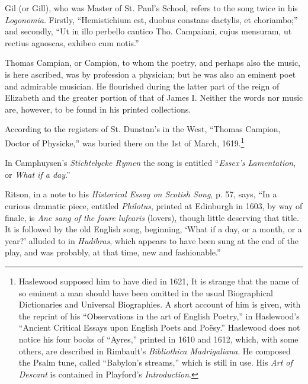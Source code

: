 Gil (or Gill), who was Master of St. Paul’s School, refers to the song twice in his
\textit{Logonomia}. Firstly, “Hemistichium est, duobus constans dactylis, et choriambo;”
and secondly, “Ut in illo perbello cantico Tho. Campaiani, cujus mensuram, ut
rectius agnoscas, exhibeo cum notis.”

Thomas Campian, or Campion, to whom the poetry, and perhaps also the
music, is here ascribed, was by profession a physician; but he was also an eminent
poet and admirable musician. He flourished during the latter part of the
reign of Elizabeth and the greater portion of that of James I. Neither the words
nor music are, however, to be found in his printed collections.

According to the registers of St. Dunstan’s in the West, “Thomas Campion,
Doctor of Physicke,” was buried there on the 1st of March, 1619.\footnote{\textit{}
Haslewood supposed him to have died in 1621, It
is strange that the name of so eminent a man should
have been omitted in the usual Biographical Dictionaries
and Universal Biographies. A short account of him is
given, with the reprint of his “Observations in the art
of English Poetry,” in Haslewood's “Ancient Critical
Essays upon English Poets and Poësy.” Haslewood
does not notice his four books of “Ayres,” printed in
1610 and 1612, which, with some others, are described in
Rimbault’s \textit{Bibliothica Madrigaliana}. He composed the
Psalm tune, called “Babylon’s streams,” which is still
in use. His \textit{Art of Descant} is contained in Playford’s
\textit{Introduction}.
}


In Camphuysen’s \textit{Stichtelycke Rymen} the song is entitled “\textit{Essex's Lamentation},
or \textit{What if a day}.”

Ritson, in a note to his \textit{Historical Essay on Scotish Song}, p. 57, says, “In a
curious dramatic piece, entitled \textit{Philotus}, printed at Edinburgh in 1603, by way
of finale, is \textit{Ane sang of the foure lufearis }(lovers), though little deserving that
title. It is followed by the old English song, beginning, ‘What if a day, or
a month, or a year?’ alluded to in \textit{Hudibras}, which appears to have been sung at
the end of the play, and was probably, at that time, new and fashionable.”

